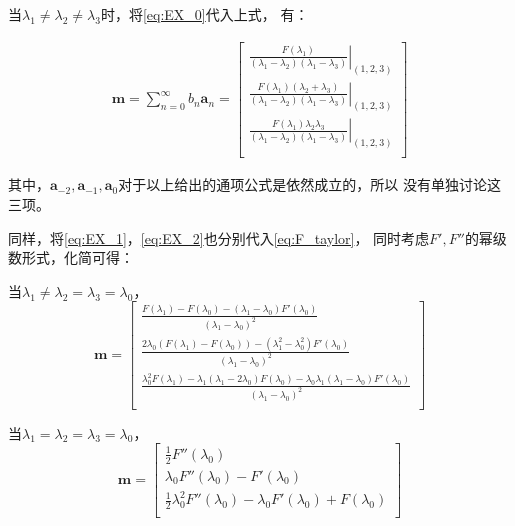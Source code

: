 \documentclass[UTF8,zihao=5]{ctexart}
\newcommand{\bm}[1]{{\mathbf{#1}}}
\begin{document}
当$\lambda_1\neq\lambda_2\neq\lambda_3$时，将\eqref{eq:EX_0}代入上式，
有：

\begin{equation}
    \begin{aligned}
        \bm{m}=\sum_{n=0}^\infty {b_n\bm{a}_n}=\begin{bmatrix}
            \left.\frac{F(\lambda_1)}{(\lambda_1-\lambda_2)(\lambda_1-\lambda_3)}\right|_{(1,2,3)}\\
        \left.\frac{F(\lambda_1)(\lambda_2+\lambda_3)}{(\lambda_1-\lambda_2)(\lambda_1-\lambda_3)}\right|_{(1,2,3)}\\
        \left.\frac{F(\lambda_1)\lambda_2\lambda_3}{(\lambda_1-\lambda_2)(\lambda_1-\lambda_3)}\right|_{(1,2,3)}\\
        \end{bmatrix}
    \end{aligned}
\end{equation}

其中，$\bm{a}_{-2}, \bm{a}_{-1}, \bm{a}_0$对于以上给出的通项公式是依然成立的，所以
没有单独讨论这三项。

同样，将\eqref{eq:EX_1}，\eqref{eq:EX_2}也分别代入\eqref{eq:F_taylor}，
同时考虑$F', F''$的幂级数形式，化简可得：

当$\lambda_1\neq\lambda_2=\lambda_3=\lambda_0$，
\begin{equation}
    \bm{m}=\begin{bmatrix}
        \frac{F(\lambda_1)-F(\lambda_0)-(\lambda_1-\lambda_0)F'(\lambda_0)}
        {(\lambda_1-\lambda_0)^2}\\
        \frac{2\lambda_0(F(\lambda_1)-F(\lambda_0))-
        (\lambda_1^2-\lambda_0^2)F'(\lambda_0)}
        {(\lambda_1-\lambda_0)^2}\\
        \frac{\lambda_0^2F(\lambda_1)-\lambda_1(\lambda_1-2\lambda_0)F(\lambda_0)
        -\lambda_0\lambda_1(\lambda_1-\lambda_0)F'(\lambda_0)}
        {(\lambda_1-\lambda_0)^2}\\
    \end{bmatrix}
\end{equation}

当$\lambda_1=\lambda_2=\lambda_3=\lambda_0$，
\begin{equation}
    \bm{m}=\begin{bmatrix}
        \frac{1}{2}F''(\lambda_0)\\
        \lambda_0F''(\lambda_0)-F'(\lambda_0)\\
        \frac{1}{2}\lambda_0^2F''(\lambda_0)-\lambda_0F'(\lambda_0)
        +F(\lambda_0)\\
    \end{bmatrix}
\end{equation}
\end{document}
